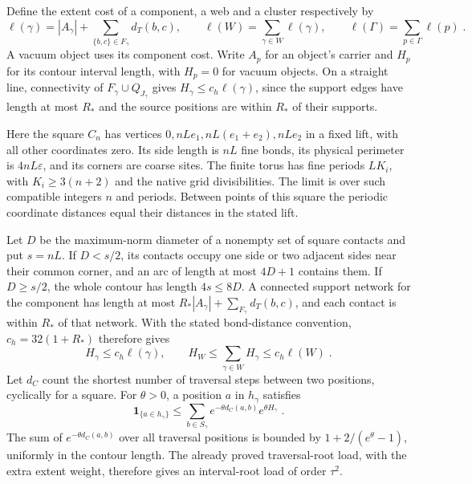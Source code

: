 \documentclass[11pt]{article}
\begin{document}
Define the extent cost of a component, a web and a cluster respectively by
\begin{equation}\label{eq:marginal-extent}
    \ell(\gamma)=|A_\gamma|+
        \sum_{\{b,c\}\in F_\gamma}d_T(b,c),
    \qquad \ell(W)=\sum_{\gamma\in W}\ell(\gamma),
    \qquad \ell(\Gamma)=\sum_{p\in \Gamma}\ell(p)\;.
\end{equation}
A vacuum object uses its component cost. Write $A_p$ for an object's carrier and $H_p$ for its contour interval length, with $H_p=0$ for vacuum objects. On a straight line, connectivity of $F_\gamma\cup Q_{J_\gamma}$ gives $H_\gamma\leq c_h\ell(\gamma)$, since the support edges have length at most $R_*$ and the source positions are within $R_*$ of their supports.

Here the square $C_n$ has vertices $0,nLe_1,nL(e_1+e_2),nLe_2$ in a fixed lift, with all other coordinates zero. Its side length is $nL$ fine bonds, its physical perimeter is $4nL\varepsilon$, and its corners are coarse sites. The finite torus has fine periods $LK_i$, with $K_i\geq 3(n+2)$ and the native grid divisibilities. The limit is over such compatible integers $n$ and periods. Between points of this square the periodic coordinate distances equal their distances in the stated lift.

Let $D$ be the maximum-norm diameter of a nonempty set of square contacts and put $s=nL$. If $D<s/2$, its contacts occupy one side or two adjacent sides near their common corner, and an arc of length at most $4D+1$ contains them. If $D\geq s/2$, the whole contour has length $4s\leq 8D$. A connected support network for the component has length at most $R_*|A_\gamma|+\sum_{F_\gamma}d_T(b,c)$, and each contact is within $R_*$ of that network. With the stated bond-distance convention, $c_h=32(1+R_*)$ therefore gives
\begin{equation}\label{eq:marginal-hull-extent}
    H_\gamma\leq c_h\ell(\gamma),
    \qquad H_W\leq \sum_{\gamma\in W}H_\gamma
        \leq c_h\ell(W)\;.
\end{equation}
Let $d_C$ count the shortest number of traversal steps between two positions, cyclically for a square. For $\theta>0$, a position $a$ in $h_\gamma$ satisfies
\begin{equation}\label{eq:marginal-hull-root}
    \mathbf1_{\{a\in h_\gamma\}}
        \leq \sum_{b\in S_\gamma}
            e^{-\theta d_C(a,b)}e^{\theta H_\gamma}\;.
\end{equation}
The sum of $e^{-\theta d_C(a,b)}$ over all traversal positions is bounded by $1+2/(e^\theta-1)$, uniformly in the contour length. The already proved traversal-root load, with the extra extent weight, therefore gives an interval-root load of order $\tau^2$.
\end{document}
